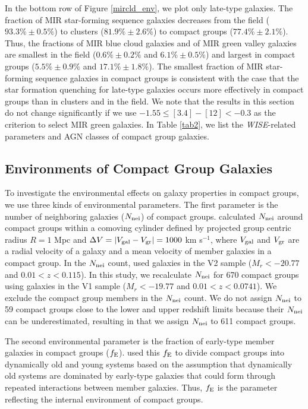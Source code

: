 \documentclass[12pt,preprint,apj]{emulateapj}
\newcommand{\efrac}{f_{\rm E}}
\newcommand{\nbg}{N_{\rm nei}}
\begin{document}
In the bottom row of Figure \ref{mircld_env}, we plot only late-type galaxies.
The fraction of MIR star-forming sequence galaxies decreases from 
the field ($93.3\%\pm0.5\%$) to clusters ($81.9\%\pm2.6\%$) 
to compact groups ($77.4\%\pm2.1\%$). 
Thus, the fractions of MIR blue cloud galaxies and of MIR green valley 
galaxies are smallest in the field ($0.6\%\pm0.2\%$ and $6.1\%\pm0.5\%$) and 
largest in compact groups ($5.5\%\pm0.9\%$ and $17.1\%\pm1.8\%$). 
The smallest fraction of MIR star-forming sequence galaxies 
in compact groups is consistent with the case that the star formation quenching for 
late-type galaxies occurs more effectively in compact groups than in clusters 
and in the field.
We note that the results in this section do not change significantly 
if we use $-1.55\leq[3.4]-[12]<-0.3$ as the criterion to select MIR green galaxies.
In Table \ref{tab2}, we list the \textit{WISE}-related parameters and AGN 
classes of compact group galaxies.

\subsection{Environments of Compact Group Galaxies}\label{env_cg}

To investigate the environmental effects on galaxy properties in compact groups, 
we use three kinds of environmental parameters. 
The first parameter is the number of neighboring galaxies ($\nbg$) of compact groups.
\citet{sohn+16} calculated $\nbg$ around compact groups 
within a comoving cylinder defined by projected group centric radius $R = 1$ Mpc 
and $\Delta V = | V_{\rm gal} - V_{\rm gr} | = 1000$ km s$^{-1}$, 
where $V_{\rm gal}$ and $V_{\rm gr}$ are a radial velocity of a galaxy and 
a mean velocity of member galaxies in a compact group.
In the $\nbg$ count, \citet{sohn+16} used galaxies in the V2 sample ($M_r<-20.77$ 
and $0.01<z<0.115$). In this study, we recalculate $\nbg$ for 670 compact groups
using galaxies in the V1 sample ($M_r<-19.77$ and $0.01<z<0.0741$). 
We exclude the compact group members in the $\nbg$ count. 
We do not assign $\nbg$ to 59 compact groups close to the lower and 
upper redshift limits because their $\nbg$ can be underestimated, 
resulting in that we assign $\nbg$ to 611 compact groups.

The second environmental parameter is the fraction of early-type member 
galaxies in compact groups ($\efrac$).
\citet{bitsakis+10,bitsakis+11,bitsakis+15} used this $\efrac$ 
to divide compact groups into dynamically old and young systems
based on the assumption that dynamically old systems are dominated 
by early-type galaxies that could form through repeated interactions between 
member galaxies.
Thus, $\efrac$ is the parameter reflecting the internal environment of compact groups. 
\end{document}
